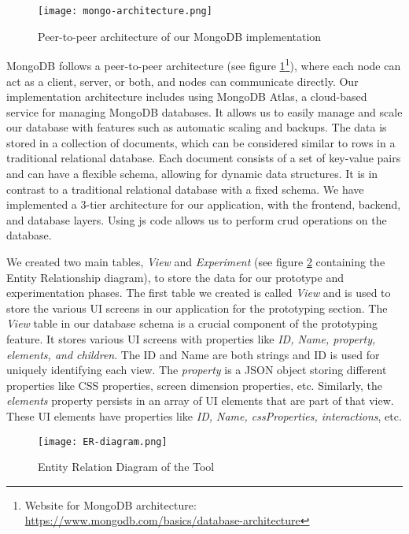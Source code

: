 \begin{figure}[ht]
    \centering
    \texttt{[image: mongo-architecture.png]}
    \caption[MongoDB Architecture]{Peer-to-peer architecture of our MongoDB implementation}
    \label{implementation:fig:mongoarchitecture}
\end{figure}

MongoDB follows a peer-to-peer architecture (see figure \ref{implementation:fig:mongoarchitecture}\footnote{Website for MongoDB architecture: \url{https://www.mongodb.com/basics/database-architecture}}), where each node can act as a client, server, or both, and nodes can communicate directly.
Our implementation architecture includes using MongoDB Atlas, a cloud-based service for managing MongoDB databases. It allows us to easily manage and scale our database with features such as automatic scaling and backups.
The data is stored in a collection of documents, which can be considered similar to rows in a traditional relational database. Each document consists of a set of key-value pairs and can have a flexible schema, allowing for dynamic data structures. It is in contrast to a traditional relational database with a fixed schema.
We have implemented a 3-tier architecture for our application, with the frontend, backend, and database layers. 
Using \ac{js} code allows us to perform \ac{crud} operations on the database.

We created two main tables, \textit{View} and \textit{Experiment} (see figure \ref{implementation:fig:erdb} containing the Entity Relationship diagram), to store the data for our prototype and experimentation phases. 
The first table we created is called \textit{View} and is used to store the various UI screens in our application for the prototyping section. 
The \textit{View} table in our database schema is a crucial component of the prototyping feature. 
It stores various UI screens with properties like \textit{ID, Name, property, elements, and children}. 
The ID and Name are both strings and ID is used for uniquely identifying each view. 
The \textit{property} is a JSON object storing different properties like CSS properties, screen dimension properties, etc. 
Similarly, the \textit{elements} property persists in an array of UI elements that are part of that view. 
These UI elements have properties like \textit{ID, Name, cssProperties, interactions}, etc.

\begin{figure}[ht]
    \centering
    \texttt{[image: ER-diagram.png]}
    \caption[Entity Relation Diagram]{Entity Relation Diagram of the Tool}
    \label{implementation:fig:erdb}
\end{figure}

